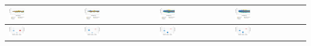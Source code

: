 \begin{table}[b]
\begin{tabularx}{\textwidth}{|Y|Y|Y|Y|}
		\includegraphics[width=0.23\textwidth]{../gfx/data/E1_001.png} &
		\includegraphics[width=0.23\textwidth]{../gfx/data/E2_001.png} &
		\includegraphics[width=0.23\textwidth]{../gfx/data/E3_001.png} &
		\includegraphics[width=0.23\textwidth]{../gfx/data/E4_001.png} \\
		
		\hline
		
		\includegraphics[width=0.23\textwidth]{../gfx/data/E1_002.png} &
		\includegraphics[width=0.23\textwidth]{../gfx/data/E2_002.png} &
		\includegraphics[width=0.23\textwidth]{../gfx/data/E3_002.png} &
		\includegraphics[width=0.23\textwidth]{../gfx/data/E4_002.png} \\
		

\end{tabularx}
\end{table}
